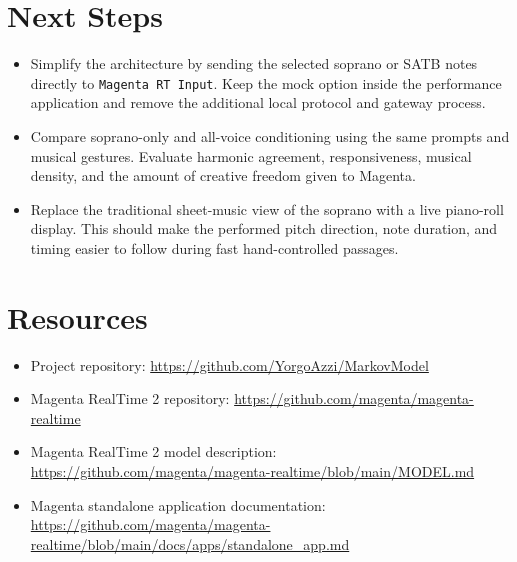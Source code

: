 \documentclass[11pt,a4paper]{article}
\begin{document}
\section{Next Steps}

\begin{itemize}
    \item Simplify the architecture by sending the selected soprano or SATB
    notes directly to \texttt{Magenta RT Input}. Keep the mock option inside the
    performance application and remove the additional local protocol and
    gateway process.
    \item Compare soprano-only and all-voice conditioning using the same prompts
    and musical gestures. Evaluate harmonic agreement, responsiveness, musical
    density, and the amount of creative freedom given to Magenta.
    \item Replace the traditional sheet-music view of the soprano with a live
    piano-roll display. This should make the performed pitch direction, note
    duration, and timing easier to follow during fast hand-controlled passages.
\end{itemize}

\section{Resources}

\begin{itemize}
    \item Project repository:
    \url{https://github.com/YorgoAzzi/MarkovModel}
    \item Magenta RealTime 2 repository:
    \url{https://github.com/magenta/magenta-realtime}
    \item Magenta RealTime 2 model description:
    \url{https://github.com/magenta/magenta-realtime/blob/main/MODEL.md}
    \item Magenta standalone application documentation:
    \url{https://github.com/magenta/magenta-realtime/blob/main/docs/apps/standalone_app.md}
\end{itemize}
\end{document}
